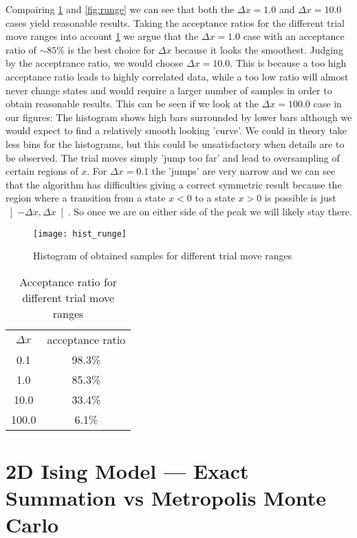 \documentclass[a4paper,11pt,bibtotoc]{scrartcl}
\begin{document}
Compairing \cref{fig:hist_runge} and \cref{fig:runge} we can see that both
the $\Delta x = 1.0$ and $\Delta x = 10.0$ cases yield reasonable results.
Taking the acceptance ratios for the different trial move ranges into account
\cref{tab:acceptance} we argue that the $\Delta x = 1.0$ case with an acceptance
ratio of $\sim 85\%$ is the best choice for $\Delta x$ because it looks the smoothest.
Judging by the acceptrance ratio, we would choose $\Delta x = 10.0$.
This is because a too high acceptance ratio leads to highly correlated data,
while a too low ratio will almost never change states and would require
a larger number of samples in order to obtain reasonable results.
This can be seen if we look at the $\Delta x = 100.0$ case in our figures:
The histogram shows high bars surrounded by lower bars although we would expect
to find a relatively smooth looking 'curve'.
We could in theory take less bins for the histograms, but this could be unsatisfactory
when details are to be observed. The trial moves simply 'jump too far'
and lead to oversampling of certain regions of $x$.
For $\Delta x = 0.1$ the 'jumps' are very narrow and we can see that the algorithm
has difficulties giving a correct symmetric result because the region where a transition
from a state $x<0$ to a state $x>0$ is possible is just $\left]-\Delta x, \Delta x \right[$.
So once we are on either side of the peak we will likely stay there.

\begin{figure}[htb]
  \centering
  \texttt{[image: hist\_runge]}
  \caption{Histogram of obtained samples for different trial move ranges}
  \label{fig:hist_runge}
\end{figure}

\begin{table}
  \centering
  \begin{tabular}{c | c}
    $\Delta x$ & acceptance ratio \\
    0.1 & 98.3\% \\
    1.0 & 85.3\% \\
    10.0 & 33.4\% \\
    100.0 & 6.1\%
  \end{tabular}
 \caption{Acceptance ratio for different trial move ranges}
 \label{tab:acceptance}
\end{table}


\section{2D Ising Model --- Exact Summation vs Metropolis Monte Carlo}
\end{document}
